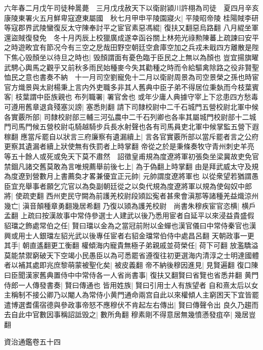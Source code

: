 六年春二月戊午司徒种暠薨　三月戊戌赦天下以衛尉潁川許栩為司徒　夏四月辛亥康陵東署火五月鮮卑寇遼東屬國　秋七月甲申平陵園寢火|{
	平陵昭帝陵}
桂陽賊李研等寇郡界武陵蠻復反太守陳奉討平之宦官素惡馮緄|{
	復扶又翻惡烏路翻}
八月緄坐軍還盜賊復發免　冬十月丙辰上校獵廣成遂幸函谷關上林苑光祿勲陳蕃上疏諫曰安平之時遊畋宜有節况今有三空之戹哉田野空朝廷空倉庫空加之兵戎未戢四方離散是陛下焦心毁顏坐以待旦之時也|{
	毁顏謂面有憂色臨于臣民之上無以為顏也}
豈宜揚旗曜武騁心輿馬之觀乎又前秋多雨民始種麥今失其勸種之時而令給驅禽除路之役非賢聖恤民之意也書奏不納　十一月司空劉寵免十二月以衛尉周景為司空景榮之孫也時宦官方熾景與太尉楊秉上言内外吏職多非其人舊典中臣子弟不得居位秉埶而今枝葉賓客|{
	枝葉謂中臣族親也}
布列職署|{
	署官舍也}
或年少庸人典據守宰上下忿患四方愁毒可遵用舊章退貪殘塞災謗|{
	塞悉則翻}
請下司隸校尉中二千石城門五營校尉北軍中候各實覈所部|{
	司隸校尉部三輔三河弘農中二千石列卿也各率其屬城門校尉部十二城門司馬門候五營校尉屯騎越騎步兵長水射聲也各有司馬員吏北軍中候掌監五營下遐稼翻}
應當斥罷自以狀言三府廉察有遺漏續上|{
	言各官實覈所部以當斥罷者言之公府更察其遺漏者續上狀使無有佚罰者上時掌翻}
帝從之於是秉條奏牧守青州刺史羊亮等五十餘人或死或免天下莫不肅然　詔徵皇甫規為度遼將軍初張奐坐梁冀故吏免官禁錮凡諸交舊莫敢為言唯規薦舉前後七上|{
	為于偽翻上時掌翻}
由是拜武威太守及規為度遼到營數月上書薦奐才畧兼優宜正元帥|{
	元帥謂度遼將軍也}
以從衆望若猶謂愚臣宜充舉事者願乞宂官以為奐副朝廷從之以奐代規為度遼將軍以規為使匈奴中郎將|{
	使疏吏翻}
西州吏民守闕為前護羌校尉段熲訟寃者甚衆會滇那等諸種羌益熾涼州幾亡|{
	滇音顛種章勇翻幾居希翻}
乃復以熲為護羌校尉　尚書朱穆疾宦官恣横|{
	横戶孟翻}
上疏曰按漢故事中常侍參選士人建武以後乃悉用宦者自延平以來浸益貴盛假貂璫之飾處常伯之任|{
	賢曰璫以金為之當冠前附以金蟬也漢官儀曰中常侍秦官也漢興或用士人銀璫左貂光武以後專任宦者右貂金璫常伯侍中處昌呂翻}
天朝政事一更其手|{
	朝直遙翻更工衡翻}
權傾海内寵貴無極子弟親戚並荷榮任|{
	荷下可翻}
放濫驕溢莫能禁禦窮破天下空竭小民愚臣以為可悉罷省遵復往初更選海内清淳之士明達國體者以補其處即兆庶黎萌蒙被聖化矣|{
	被皮義翻}
帝不納後穆因進見|{
	見賢遍翻}
復口陳曰臣聞漢家舊典置侍中中常侍各一人省尚書事|{
	復扶又翻賢曰省覽也省悉井翻}
黄門侍郎一人傳發書奏|{
	賢曰傳通也}
皆用姓族|{
	賢曰引用士人有族望者}
自和熹太后以女主稱制不接公卿乃以閹人為常侍小黄門通命兩宫自此以來權傾人主窮困天下宜皆罷遣博選耆儒宿德與參政事帝怒不應穆伏不肯起左右傳出|{
	賢曰傳聲令出}
良久乃趨而去自此中官數因事稱詔詆毁之|{
	數所角翻}
穆素剛不得意居無幾憤懣發疽卒|{
	幾居豈翻}


資治通鑑卷五十四
